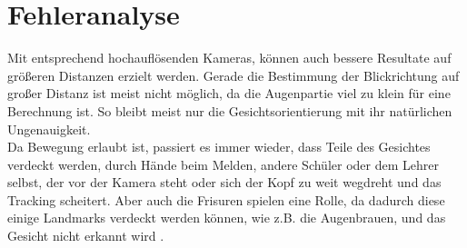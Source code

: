 \section{Fehleranalyse}
Mit entsprechend hochauflösenden Kameras, können auch bessere Resultate auf größeren Distanzen erzielt werden. Gerade die Bestimmung der Blickrichtung auf großer Distanz ist meist nicht möglich, da die Augenpartie viel zu klein für eine Berechnung ist. So bleibt meist nur die Gesichtsorientierung mit ihr natürlichen Ungenauigkeit.\\
Da Bewegung erlaubt ist, passiert es immer wieder, dass Teile des Gesichtes verdeckt werden, durch Hände beim Melden, andere Schüler oder dem Lehrer selbst, der vor der Kamera steht oder sich der Kopf zu weit wegdreht und das Tracking scheitert. Aber auch die Frisuren spielen eine Rolle, da dadurch diese einige Landmarks verdeckt werden können, wie z.B. die Augenbrauen, und das Gesicht nicht erkannt wird .